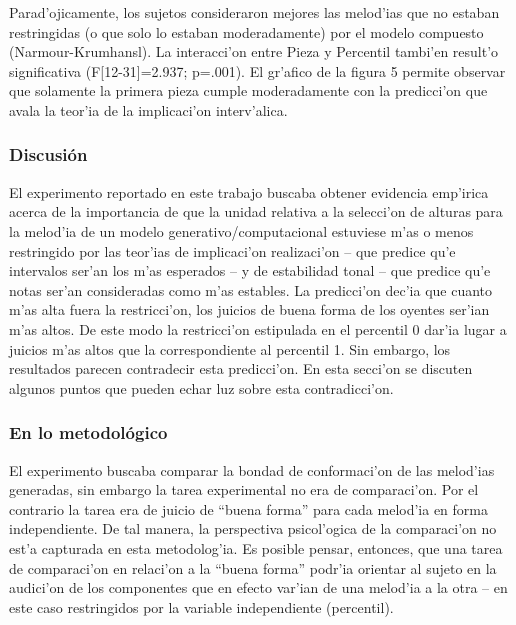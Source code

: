 \begin{imagen}
    \width{9cm}
\end{imagen}

Parad'ojicamente, los sujetos consideraron mejores las melod'ias que no estaban restringidas (o que solo lo estaban moderadamente) por el modelo compuesto (Narmour-Krumhansl). 
La interacci'on entre Pieza y Percentil tambi'en result'o significativa (F[12-31]=2.937; p=.001). El gr'afico de la figura 5 permite observar que solamente la primera pieza cumple moderadamente con la predicci'on que avala la teor'ia de la implicaci'on interv'alica.


\begin{imagen}
    \width{9cm}
\end{imagen}


\subsubsection{Discusi\'on}
El experimento reportado en este trabajo buscaba obtener evidencia emp'irica acerca de la importancia de que la unidad relativa a la selecci'on de alturas para la 
melod'ia de un modelo generativo/computacional estuviese m'as o menos restringido por las teor'ias de implicaci'on realizaci'on -- que predice qu'e 
intervalos ser'an los m'as esperados -- y de estabilidad tonal -- que predice qu'e notas ser'an consideradas como m'as estables. 
La predicci'on dec'ia que cuanto m'as alta fuera la restricci'on, los juicios de buena forma de los oyentes ser'ian m'as altos. De este modo 
la restricci'on estipulada en el percentil 0 dar'ia lugar a juicios m'as altos que la correspondiente al percentil 1. Sin embargo, los resultados parecen 
contradecir esta predicci'on. En esta secci'on se discuten algunos puntos que pueden echar luz sobre esta contradicci'on. 

\subsubsection{En lo metodol\'ogico}
El experimento buscaba comparar la bondad de conformaci'on de las melod'ias generadas, sin embargo la tarea experimental no era de comparaci'on. Por el contrario la tarea 
era de juicio de ``buena forma'' para cada melod'ia en forma independiente. De tal manera, la perspectiva psicol'ogica de la comparaci'on no est'a capturada en esta 
metodolog'ia. Es posible pensar, entonces, que una tarea de comparaci'on en relaci'on a la ``buena forma'' podr'ia orientar al sujeto en la audici'on de los componentes 
que en efecto var'ian de una melod'ia a la otra -- en este caso restringidos por la variable independiente (percentil).

